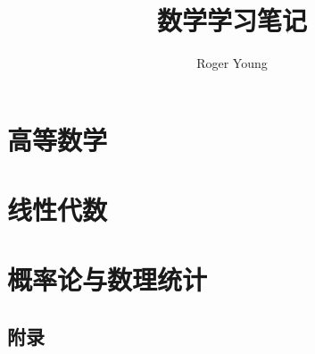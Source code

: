 \documentclass{book}
\newcommand{\documentTitle}
    {\texorpdfstring{数学学习笔记}{数学学习笔记}}
\newcommand{\documentAuthor}{Roger Young}
\begin{document}
\title{\documentTitle}
\author{\documentAuthor}

\maketitle
\tableofcontents

\part{高等数学}















\part{线性代数}







\part{概率论与数理统计}














\chapter*{附录}
\printindex
\printglossaries
\end{document}
